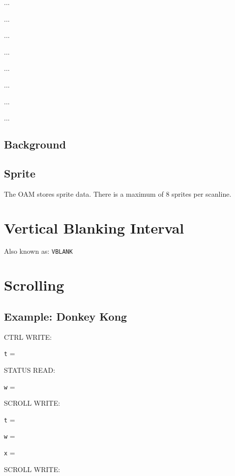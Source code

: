 ... 

 ... 

 ... 

 ... 

 ... 

 ... 

 ... 

 ... 

\subsection{Background}

\subsection{Sprite}

The OAM stores sprite data.
There is a maximum of 8 sprites per scanline.

\section{Vertical Blanking Interval}

Also known as: \texttt{VBLANK}

\section{Scrolling}

\subsection{Example: Donkey Kong}

\indent CTRL WRITE: 

\texttt{t} = 

STATUS READ: 

\texttt{w} = 

SCROLL WRITE: 

\texttt{t} = 

\texttt{w} = 

\texttt{x} = 

SCROLL WRITE: 

